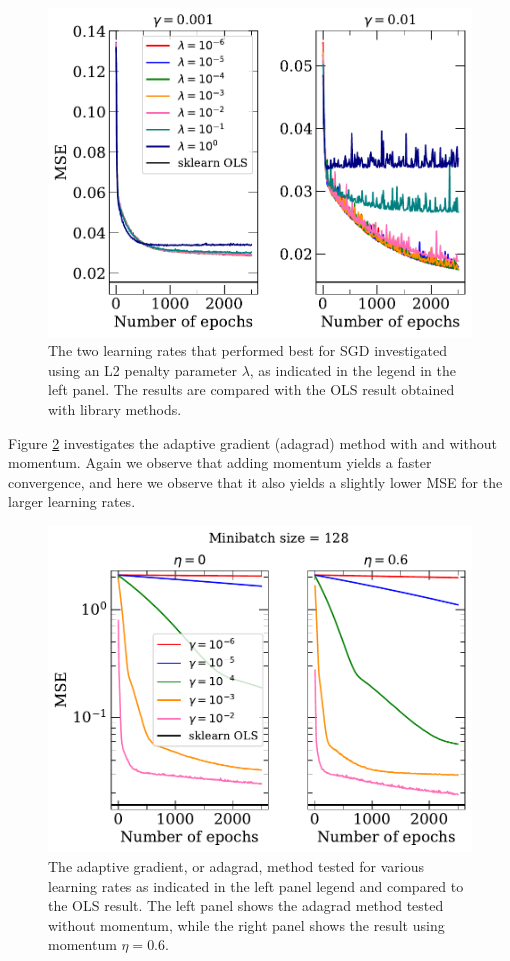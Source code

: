 \documentclass[a4paper, 
amsfonts, 
amssymb, 
amsmath, 
reprint, 
showkeys, 
nofootinbib, 
twoside]{revtex4-2}
\begin{document}
\begin{figure} [h]
    \centering
    \includegraphics[width = \columnwidth]{Figures/sgd_ridge_1.pdf}
    \caption{The two learning rates that performed best for SGD investigated using an L2 penalty parameter $\lambda$, as indicated in the legend in the left panel. The results are compared with the OLS result obtained with library methods. }
    \label{fig:sgd_ridge}
\end{figure}



Figure \ref{fig:adagrad} investigates the adaptive gradient (adagrad) method with and without momentum. Again we observe that adding momentum yields a faster convergence, and here we observe that it also yields a slightly lower MSE for the larger learning rates. 


\begin{figure}
    \centering
    \includegraphics[width = \columnwidth]{Figures/adagrad_1.pdf}
    \caption{The adaptive gradient, or adagrad, method tested for various learning rates as indicated in the left panel legend and compared to the OLS result. The left panel shows the adagrad method tested without momentum, while the right panel shows the result using momentum $\eta = 0.6$.}
    \label{fig:adagrad}
\end{figure}
\end{document}
